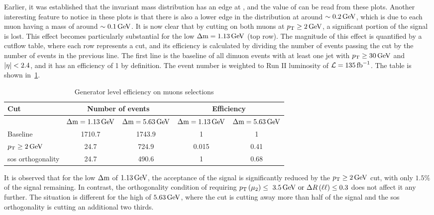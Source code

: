 Earlier, it was established that the invariant mass distribution has an edge at \dm, and the value of \dm can be read from these plots. Another interesting feature to notice in these plots is that there is also a lower edge in the \dm distribution at around $\sim 0.2\,\text{Ge\hspace{-.08em}V}$, which is due to each muon having a mass of around $\sim 0.1\,\text{Ge\hspace{-.08em}V}$. It is now clear that by cutting on both muons at $p_{\mathrm{T}}\geq 2\,\text{Ge\hspace{-.08em}V}$, a significant portion of the signal is lost. This effect becomes particularly substantial for the low $\Delta\mathrm{m}=1.13\,\text{Ge\hspace{-.08em}V}$ (top row). The magnitude of this effect is quantified by a cutflow table, where each row represents a cut, and its efficiency is calculated by dividing the number of events passing the cut by the number of events in the previous line. The first line is the baseline of all dimuon events with at least one jet with $p_{\mathrm{T}} \geq 30\,\text{Ge\hspace{-.08em}V}$ and $\lvert \eta \rvert<2.4$, and it has an efficiency of 1 by definition. The event number is weighted to Run II luminosity of $\mathcal{L} = 135 \mbox{\ensuremath{\,\text{fb}^{-1}}}$. The table is shown in~\ref{tab:gen-muon-pt-dr-efficiency}.

\begin{table}[!htb]
	\centering
	\label{tab:gen-muon-pt-dr-efficiency}
		\caption{Generator level efficiency on muons selections}
			\begin{tabular}{l|cc|cc} \hline
			Cut & \multicolumn{2}{c|}{Number of events} & \multicolumn{2}{c}{Efficiency} \\ \hline
			
			 & $\Delta\mathrm{m}=1.13\,\text{Ge\hspace{-.08em}V}$ & $\Delta\mathrm{m}=5.63\,\text{Ge\hspace{-.08em}V}$ & $\Delta\mathrm{m}=1.13\,\text{Ge\hspace{-.08em}V}$ & $\Delta\mathrm{m}=5.63\,\text{Ge\hspace{-.08em}V}$ \\
			Baseline & 1710.7 & 1743.9 & 1 & 1\\
			$p_{\mathrm{T}}\geq 2\,\text{Ge\hspace{-.08em}V}$ & 24.7 & 724.9 & 0.015 & 0.41\\
			\gls{sos} orthogonality & 24.7 & 490.6 & 1 & 0.68 \\ \hline
			\end{tabular}
\end{table}

It is observed that for the low $\Delta\mathrm{m}$ of $1.13\,\text{Ge\hspace{-.08em}V}$, the acceptance of the signal is significantly reduced by the $p_{\mathrm{T}}\geq 2\,\text{Ge\hspace{-.08em}V}$ cut, with only $1.5\%$ of the signal remaining. In contrast, the orthogonality condition of requiring $p_{\mathrm{T}}\left(\mu_2\right)\leq~3.5\,\text{Ge\hspace{-.08em}V}\text{ or }\Delta R\left(\ell\ell\right)\leq 0.3$ does not affect it any further. The situation is different for the high \dm of $5.63\,\text{Ge\hspace{-.08em}V}$, where the \pt cut is cutting away more than half of the signal and the \gls{sos} orthogonality is cutting an additional two thirds.

